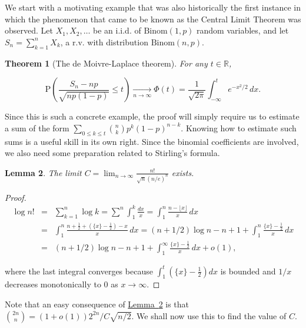 \documentclass[11pt]{report}
\newcommand{\R}{\mathbb{R}}
\theoremstyle{plain}
\newtheorem{thm}{Theorem}[chapter]
\newtheorem{lem}[thm]{Lemma}
\theoremstyle{definition}
\begin{document}
We start with a motivating example that was also
historically the first instance in which the
phenomenon that came to be known as the Central Limit
Theorem was observed. Let $X_1, X_2, \ldots$ be an
i.i.d. of $\textrm{Binom}(1,p)$ random variables, and
let $S_n = \sum_{k=1}^n X_k$, a r.v. with
distribution $\textrm{Binom}(n,p)$.

\begin{thm}[The de Moivre-Laplace theorem]
\label{thm-demoivre-laplace}
For any $t\in \R$,

\[
\mathrm{P}
\left(\frac{S_n - n p}{\sqrt{n p(1-p)}} \le t \right) \xrightarrow[n\to\infty]{} \Phi(t) = \frac{1}{\sqrt{2\pi}}
\int_{-\infty}^t e^{-x^2/2}\,dx.
\]

\end{thm}

\noindent Since this is such a concrete example, the proof will
simply require us to estimate a sum of the form
$\sum_{0\le k\le t} \binom{n}{k} p^k (1-p)^{n-k}$.
Knowing how to estimate such sums is a useful skill in
its own right. Since the binomial coefficients are
involved, we also need some preparation related to
Stirling's formula.

\begin{lem}
\label{lem-prestirling}
The limit
$C = \lim_{n\to\infty} \frac{n!}{\sqrt{n} (n/e)^n}$
exists.
\end{lem}

\begin{proof}

\begin{eqnarray*}
\log n! &=& \sum_{k=1}^n \log k = \sum_{}^n \int_1^k \frac{dx}{x} = \int_1^n \frac{n-\lfloor x\rfloor}{x}\,dx \\
&=& \int_1^n \frac{n+\frac12 + (\{ x\}-\frac12)-x}{x}\, dx = (n+1/2)\log n - n + 1 + \int_1^n \frac{\{x\}-\frac12}{x}\,dx \\
&=& (n+1/2)\log n - n + 1 + \int_1^\infty \frac{\{x\}-\frac12}{x}\,dx + o(1),
\end{eqnarray*}

\noindent where the last integral converges because
$\int_1^t (\{x\}-\frac12) dx$ is bounded and $1/x$
decreases monotonically to 0 as $x\to\infty$.
\end{proof}

\noindent Note that an easy consequence of \texorpdfstring{\hyperref[lem-prestirling]{Lemma~\ref*{lem-prestirling}}}{Lemma} is that
$\binom{2n}{n} = (1+o(1))2^{2n}/C\sqrt{n/2}$. We
shall now use this to find the value of $C$.
\end{document}
